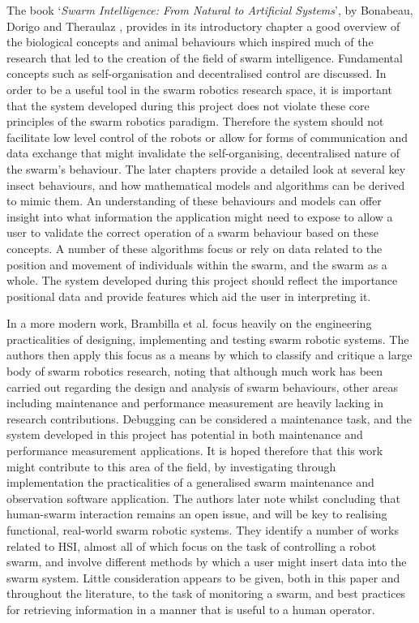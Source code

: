 The book `\textit{Swarm Intelligence: From Natural to Artificial Systems}', by Bonabeau, Dorigo and Theraulaz \cite{Bonabeau:1999}, provides in its introductory chapter a good overview of the biological concepts and animal behaviours which inspired much of the research that led to the creation of the field of swarm intelligence. Fundamental concepts such as self-organisation and decentralised control are discussed. In order to be a useful tool in the swarm robotics research space, it is important that the system developed during this project does not violate these core principles of the swarm robotics paradigm. Therefore the system should not facilitate low level control of the robots or allow for forms of communication and data exchange that might invalidate the self-organising, decentralised nature of the swarm's behaviour. The later chapters \cite{Bonabeau:1999} provide a detailed look at several key insect behaviours, and how mathematical models and algorithms can be derived to mimic them. An understanding of these behaviours and models can offer insight into what information the application might need to expose to allow a user to validate the correct operation of a swarm behaviour based on these concepts. A number of these algorithms focus or rely on data related to the position and movement of individuals within the swarm, and the swarm as a whole. The system developed during this project should reflect the importance positional data and provide features which aid the user in interpreting it.

In a more modern work, Brambilla et al. \cite{Brambilla:2013} focus heavily on the engineering practicalities of designing, implementing and testing swarm robotic systems. The authors then apply this focus as a means by which to classify and critique a large body of swarm robotics research, noting that although much work has been carried out regarding the design and analysis of swarm behaviours, other areas including maintenance and performance measurement are heavily lacking in research contributions. Debugging can be considered a maintenance task, and the system developed in this project has potential in both maintenance and performance measurement applications. It is hoped therefore that this work might contribute to this area of the field, by investigating through implementation the practicalities of a generalised swarm maintenance and observation software application. The authors \cite{Brambilla:2013} later note whilst concluding that human-swarm interaction remains an open issue, and will be key to realising functional, real-world swarm robotic systems. They identify a number of works related to HSI, almost all of which focus on the task of controlling a robot swarm, and involve different methods by which a user might insert data into the swarm system. Little consideration appears to be given, both in this paper and throughout the literature, to the task of monitoring a swarm, and best practices for retrieving information in a manner that is useful to a human operator.

